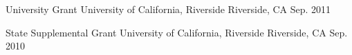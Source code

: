 

\begin{cvhonors}

  \cvhonor
    {University Grant} %
    {University of California, Riverside} %
    {Riverside, CA} %
    {Sep. 2011} %

  \cvhonor
    {State Supplemental Grant} %
    {University of California, Riverside} %
    {Riverside, CA} %
    {Sep. 2010} %

\end{cvhonors}
